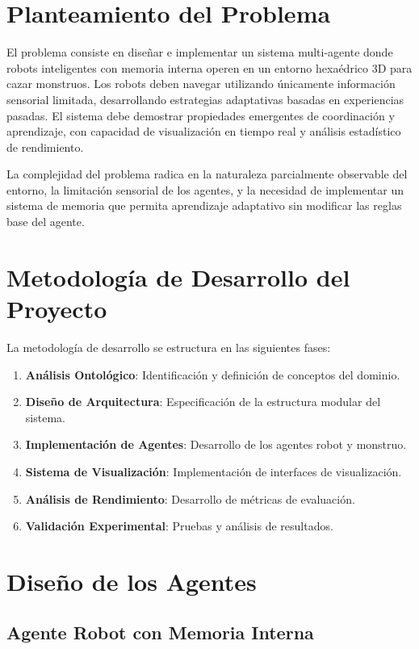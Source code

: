 \documentclass[10pt,twocolumn]{article}
\begin{document}
\section{Planteamiento del Problema}

El problema consiste en diseñar e implementar un sistema multi-agente donde robots inteligentes con memoria interna operen en un entorno hexaédrico 3D para cazar monstruos. Los robots deben navegar utilizando únicamente información sensorial limitada, desarrollando estrategias adaptativas basadas en experiencias pasadas. El sistema debe demostrar propiedades emergentes de coordinación y aprendizaje, con capacidad de visualización en tiempo real y análisis estadístico de rendimiento.

La complejidad del problema radica en la naturaleza parcialmente observable del entorno, la limitación sensorial de los agentes, y la necesidad de implementar un sistema de memoria que permita aprendizaje adaptativo sin modificar las reglas base del agente.

\section{Metodología de Desarrollo del Proyecto}

La metodología de desarrollo se estructura en las siguientes fases:

\begin{enumerate}
\item \textbf{Análisis Ontológico}: Identificación y definición de conceptos del dominio.
\item \textbf{Diseño de Arquitectura}: Especificación de la estructura modular del sistema.
\item \textbf{Implementación de Agentes}: Desarrollo de los agentes robot y monstruo.
\item \textbf{Sistema de Visualización}: Implementación de interfaces de visualización.
\item \textbf{Análisis de Rendimiento}: Desarrollo de métricas de evaluación.
\item \textbf{Validación Experimental}: Pruebas y análisis de resultados.
\end{enumerate}

\section{Diseño de los Agentes}

\subsection{Agente Robot con Memoria Interna}
\end{document}
